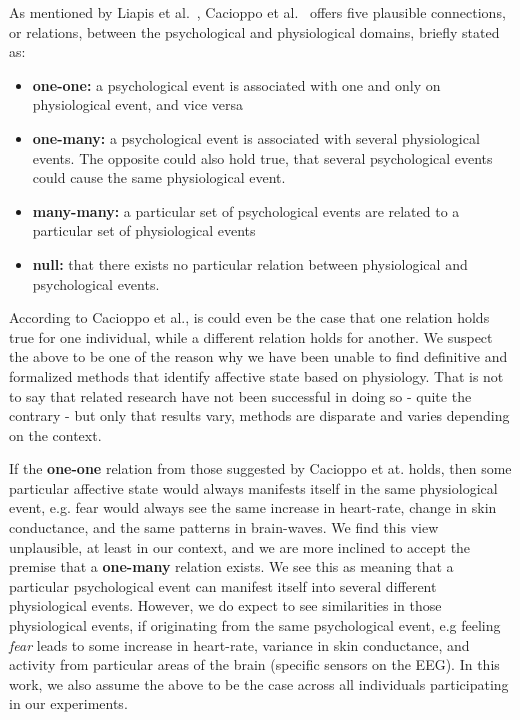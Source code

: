 As mentioned by Liapis et al.~\cite{fusion4}, Cacioppo et al.~\cite[p. 8-9]{handbook-psychophysiology} offers five
plausible connections, or relations, between the psychological and physiological domains, briefly stated as:

\begin{itemize}[noitemsep, nolistsep]
\item \textbf{one-one:} a psychological event is associated with one and only on physiological event, and vice versa
\item \textbf{one-many:} a psychological event is associated with several physiological events. The opposite could also
  hold true, that several psychological events could cause the same physiological event.
\item \textbf{many-many:} a particular set of psychological events are related to a particular set of physiological
  events
\item \textbf{null:} that there exists no particular relation between physiological and psychological events.
\end{itemize}

According to Cacioppo et al., is could even be the case that one relation holds true for one individual, while a
different relation holds for another. We suspect the above to be one of the reason why we have been unable to find
definitive and formalized methods that identify affective state based on physiology. That is not to say that related
research have not been successful in doing so - quite the contrary - but only that results vary, methods are disparate
and varies depending on the context.

If the \textbf{one-one} relation from those suggested by Cacioppo et at. holds, then some particular affective state
would always manifests itself in the same physiological event, e.g. fear would always see the same increase in
heart-rate, change in skin conductance, and the same patterns in brain-waves. We find this view unplausible, at least in
our context, and we are more inclined to accept the premise that a \textbf{one-many} relation exists. We see this as
meaning that a particular psychological event can manifest itself into several different physiological events. However,
we do expect to see similarities in those physiological events, if originating from the same psychological event, e.g
feeling \textit{fear} leads to some increase in heart-rate, variance in skin conductance, and activity from particular
areas of the brain (specific sensors on the EEG). In this work, we also assume the above to be the case across all
individuals participating in our experiments.

